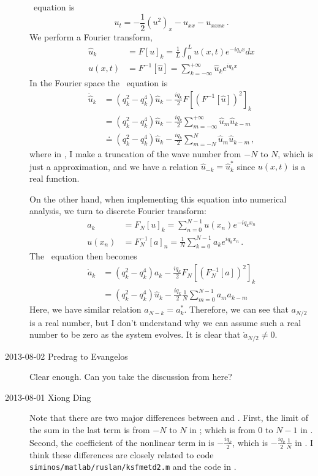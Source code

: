 \begin{description}
\KS\ equation is
\[
 u_t=-\frac{1}{2}(u^2)_x-u_{xx}-u_{xxxx}
 \,.
\]
We perform a Fourier transform,
\begin{align*}
 \hat{u}_{k} &= F[u]_{k}= \frac{1}{L}\int_{0}^{L} u(x,t)e^{-iq_{k}x}dx\\
 u(x,t) &= F^{-1}[\hat{u}] = \sum_{k=-\infty}^{+\infty} \hat{u}_{k} e^{iq_{k}x}
\end{align*}
In the Fourier space the \KS\ equation is
\begin{align}
 \dot{\hat{u}}_{k} &= (q^{2}_{k}-q^{4}_{k})\hat{u}_{k}-\frac{iq_{k}}{2}F[(F^{-1}[\hat{u}])^{2}]_{k}\nonumber\\
 &= (q^{2}_{k}-q^{4}_{k})\hat{u}_{k}-\frac{iq_{k}}{2} \sum_{m=-\infty}^{+\infty} \hat{u}_{m}\hat{u}_{k-m}\nonumber\\
 & \doteq (q^{2}_{k}-q^{4}_{k})\hat{u}_{k}-\frac{iq_{k}}{2} \sum_{m=-N}^{N} \hat{u}_{m}\hat{u}_{k-m}\label{xfft1}
\,,
\end{align}
where in , I make a truncation of the wave number from $-N$ to $N$, which is just a approximation, and we have
a relation $\hat{u}_{-k}=\hat{u}_{k}^{*}$ since $u(x,t)$ is a real function.

On the other hand, when implementing this equation into numerical
analysis, we turn to discrete Fourier transform:
\begin{align*}
 a_{k} &= F_{N}[u]_{k}= \sum_{n=0}^{N-1} u(x_{n})e^{-iq_{k}x_{n}}\\
 u(x_{n}) &= F_{N}^{-1}[a]_{n} = \frac{1}{N}\sum_{k=0}^{N-1} a_{k} e^{iq_{k}x_{n}}
\,.
\end{align*}
The \KS\ equation then becomes
\begin{align}
 \dot{a}_{k} &= (q^{2}_{k}-q^{4}_{k})a_{k}-\frac{iq_{k}}{2}F_{N}[(F_{N}^{-1}[a])^{2}]_{k}\nonumber\\
 &= (q^{2}_{k}-q^{4}_{k})\hat{u}_{k}-\frac{iq_{k}}{2} \frac{1}{N} \sum_{m=0}^{N-1} a_{m}a_{k-m} \label{xfft2}
\end{align}
Here, we have similar relation $a_{N-k}=a_{k}^{*}$. Therefore, we can see that $a_{N/2}$ is a real number, but I
don't understand why we can assume such a real number to be zero as the system evolves. It is clear that
$\dot{a}_{N/2}\ne 0$.

\item[2013-08-02 Predrag to Evangelos] Clear enough. Can you take
the discussion from here?

\item[2013-08-01 Xiong Ding]
Note that there are two major differences between  and . First, the limit of the sum in the
last term is from $-N$ to $N$ in ; which is from $0$ to $N-1$ in . Second, the coefficient of
the nonlinear term in  is $-\frac{iq_{k}}{2}$, which is $-\frac{iq_{k}}{2} \frac{1}{N}$ in .
I think these differences are closely related to code\\
\texttt{siminos/matlab/ruslan/ksfmetd2.m} and the code in .\\


\end{description}
